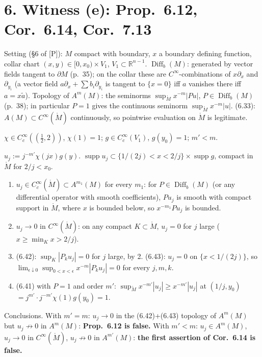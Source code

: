 \documentclass[11pt]{article}
\newcommand{\R}{\mathbb{R}}
\newcommand{\supp}{\operatorname{supp}}
\newcommand{\Diff}{\operatorname{Diff}}
\newcommand{\Mo}{\mathring{M}}
\begin{document}
\section*{6. Witness (e): Prop.~6.12, Cor.~6.14, Cor.~7.13}
Setting (\S6 of [P]): $M$ compact with boundary, $x$ a boundary defining function, collar chart $(x,y)\in[0,x_0)\times V_1$, $V_1\subset\R^{n-1}$. $\Diff_b(M)$: generated by vector fields tangent to $\partial M$ (p.~35); on the collar these are $C^\infty$-combinations of $x\partial_x$ and $\partial_{y_i}$ (a vector field $a\partial_x+\sum b_i\partial_{y_i}$ is tangent to $\{x=0\}$ iff $a$ vanishes there iff $a=x\tilde a$). Topology of $A^m(M)$: the seminorms $\sup_{\Mo}x^{-m}|Pu|$, $P\in\Diff_b(M)$ (p.~38); in particular $P=1$ gives the continuous seminorm $\sup_{\Mo}x^{-m}|u|$. (6.33): $A(M)\subset C^\infty(\Mo)$ continuously, so pointwise evaluation on $\Mo$ is legitimate.

$\chi\in C_c^\infty((\tfrac12,2))$, $\chi(1)=1$; $g\in C_c^\infty(V_1)$, $g(y_0)=1$; $m'<m$.

$u_j:=j^{-m'}\chi(jx)g(y)$. $\supp u_j\subset\{1/(2j)<x<2/j\}\times\supp g$, compact in $\Mo$ for $2/j<x_0$.
\begin{enumerate}
\item $u_j\in C_c^\infty(\Mo)\subset A^{m_1}(M)$ for every $m_1$: for $P\in\Diff_b(M)$ (or any differential operator with smooth coefficients), $Pu_j$ is smooth with compact support in $\Mo$, where $x$ is bounded below, so $x^{-m_1}Pu_j$ is bounded.
\item $u_j\to0$ in $C^\infty(\Mo)$: on any compact $K\subset\Mo$, $u_j=0$ for $j$ large ($x\ge\min_Kx>2/j$).
\item (6.42): $\sup_K|P_ku_j|=0$ for $j$ large, by 2. (6.43): $u_j=0$ on $\{x<1/(2j)\}$, so $\lim_{\epsilon\downarrow0}\sup_{0<x<\epsilon}x^{-m}|P_ku_j|=0$ for every $j,m,k$.
\item (6.41) with $P=1$ and order $m'$: $\sup_{\Mo}x^{-m'}|u_j|\ge x^{-m'}|u_j|$ at $(1/j,y_0)$ $=j^{m'}\cdot j^{-m'}\chi(1)g(y_0)=1$.
\end{enumerate}
Conclusions. With $m'=m$: $u_j\to0$ in the (6.42)+(6.43) topology of $A^m(M)$ but $u_j\not\to0$ in $A^m(M)$: \textbf{Prop.~6.12 is false.} With $m'<m$: $u_j\in A^m(M)$, $u_j\to0$ in $C^\infty(\Mo)$, $u_j\not\to0$ in $A^{m'}(M)$: \textbf{the first assertion of Cor.~6.14 is false.}
\end{document}
